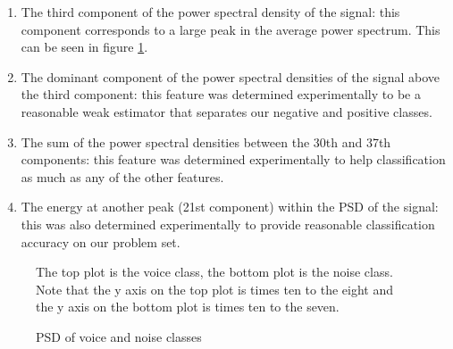 \documentclass[ %
                    author={Sam Phippen},
                supervisor={Dr. Rafal Bogacz},
                     title={Real time voice activity detectors in noisy personal computing environments},
                  subtitle={},
                    degree={MEng},
                      year={2012} ]{thesis}
\begin{document}
\begin{enumerate}
    \item The third component of the power spectral density of the signal: this
        component corresponds to a large peak in the average power spectrum.
        This can be seen in figure \ref{fig:psd}.

    \item The dominant component of the power spectral densities of the signal
        above the third component: this feature was determined experimentally
        to be a reasonable weak estimator that separates our negative and
        positive classes.

    \item The sum of the power spectral densities between the 30th and 37th
        components: this feature was determined experimentally to help
        classification as much as any of the other features.

    \item The energy at another peak (21st component) within the PSD of the
        signal: this was also determined experimentally to provide reasonable
        classification accuracy on our problem set.

\end{enumerate}

\begin{figure}

    \caption{PSD of voice and noise classes}

    The top plot is the voice class, the bottom plot is the noise class. Note
    that the y axis on the top plot is times ten to the eight and the y axis on
    the bottom plot is times ten to the seven.


    \label{fig:psd}

\end{figure}
\end{document}
